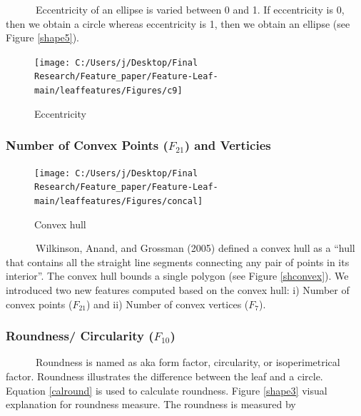\documentclass{article}
\begin{document}
~~~~~~Eccentricity of an ellipse is varied between 0 and 1. If
eccentricity is 0, then we obtain a circle whereas eccentricity is 1,
then we obtain an ellipse (see Figure \ref{shape5}).

\begin{figure}[!ht]

{\centering \texttt{[image: C:/Users/j/Desktop/Final Research/Feature\_paper/Feature-Leaf-main/leaffeatures/Figures/c9]} 

}

\caption{\label{shape5}Eccentricity}\label{fig:unnamed-chunk-19}
\end{figure}

\newpage

\hypertarget{number-of-convex-points-f_21-and-verticies}{%
\subsubsection{\texorpdfstring{Number of Convex Points (\(F_{21}\)) and
Verticies}{Number of Convex Points (F\_\{21\}) and Verticies}}\label{number-of-convex-points-f_21-and-verticies}}

\begin{figure}[!ht]

{\centering \texttt{[image: C:/Users/j/Desktop/Final Research/Feature\_paper/Feature-Leaf-main/leaffeatures/Figures/concal]} 

}

\caption{\label{shconvex}Convex hull}\label{fig:unnamed-chunk-20}
\end{figure}

~~~~~~Wilkinson, Anand, and Grossman (2005) defined a convex hull as a
``hull that contains all the straight line segments connecting any pair
of points in its interior''. The convex hull bounds a single polygon
(see Figure \ref{shconvex}). We introduced two new features computed
based on the convex hull: i) Number of convex points (\(F_{21}\)) and
ii) Number of convex vertices (\(F_7\)).

\hypertarget{roundness-circularity-f_10}{%
\subsubsection{\texorpdfstring{Roundness/ Circularity
(\(F_{10}\))}{Roundness/ Circularity (F\_\{10\})}}\label{roundness-circularity-f_10}}

~~~~~~Roundness is named as aka form factor, circularity, or
isoperimetrical factor. Roundness illustrates the difference between the
leaf and a circle. Equation \ref{calround} is used to calculate
roundness. Figure \ref{shape3} visual explanation for roundness measure.
The roundness is measured by
\end{document}
